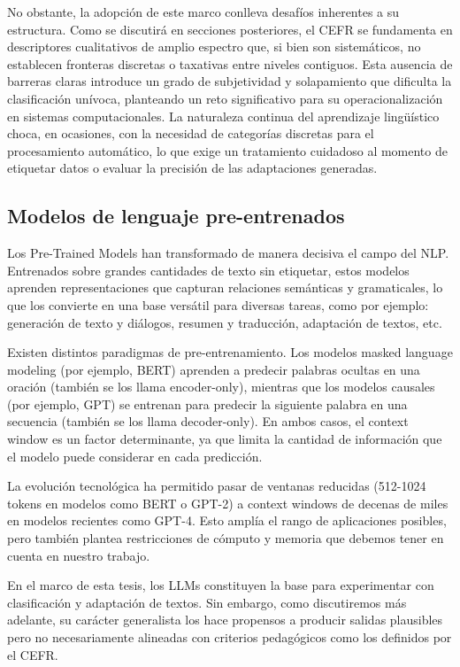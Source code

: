 No obstante, la adopción de este marco conlleva desafíos inherentes a su estructura. Como se discutirá en secciones posteriores, el CEFR se fundamenta en descriptores cualitativos de amplio espectro que, si bien son sistemáticos, no establecen fronteras discretas o taxativas entre niveles contiguos. Esta ausencia de barreras claras introduce un grado de subjetividad y solapamiento que dificulta la clasificación unívoca, planteando un reto significativo para su operacionalización en sistemas computacionales. La naturaleza continua del aprendizaje lingüístico choca, en ocasiones, con la necesidad de categorías discretas para el procesamiento automático, lo que exige un tratamiento cuidadoso al momento de etiquetar datos o evaluar la precisión de las adaptaciones generadas.


\subsection{Modelos de lenguaje pre-entrenados} \label{subsec:modelos_pretrain}
Los Pre-Trained Models han transformado de manera decisiva el campo del NLP. Entrenados sobre grandes cantidades de texto sin etiquetar, estos modelos aprenden representaciones que capturan relaciones semánticas y gramaticales, lo que los convierte en una base versátil para diversas tareas, como por ejemplo: generación de texto y diálogos, resumen y traducción, adaptación de textos, etc.

Existen distintos paradigmas de pre-entrenamiento. Los modelos masked language modeling (por ejemplo, BERT\parencite{Devlin2018}) aprenden a predecir palabras ocultas en una oración (también se los llama encoder-only), mientras que los modelos causales (por ejemplo, GPT\parencite{paper_gpt}) se entrenan para predecir la siguiente palabra en una secuencia (también se los llama decoder-only). En ambos casos, el context window es un factor determinante, ya que limita la cantidad de información que el modelo puede considerar en cada predicción.

La evolución tecnológica ha permitido pasar de ventanas reducidas (512-1024 tokens en modelos como BERT o GPT-2) a context windows de decenas de miles en modelos recientes como GPT-4. Esto amplía el rango de aplicaciones posibles, pero también plantea restricciones de cómputo y memoria que debemos tener en cuenta en nuestro trabajo.

En el marco de esta tesis, los LLMs constituyen la base para experimentar con clasificación y adaptación de textos. Sin embargo, como discutiremos más adelante, su carácter generalista los hace propensos a producir salidas plausibles pero no necesariamente alineadas con criterios pedagógicos como los definidos por el CEFR.

